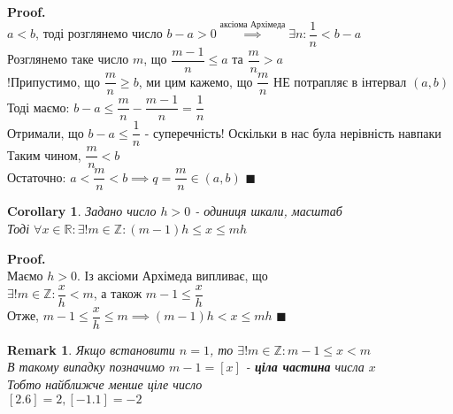 \documentclass[a4paper, 14pt]{extarticle}
\theoremstyle{theoremdd}
\theoremstyle{theoremdd}
\theoremstyle{theoremdd}
\theoremstyle{theoremdd}
\theoremstyle{theoremdd}
\theoremstyle{theoremdd}
\newtheorem{remark}[theorem]{Remark}
\theoremstyle{theoremdd}
\theoremstyle{theoremdd}
\newtheorem{corollary}[theorem]{Corollary}
\newenvironment{pf}{\vspace*{-3mm} \textbf{Proof. \\}}{$\blacksquare$}
\begin{document}
	\begin{pf}
	$a < b$, тоді розглянемо число $b-a>0 \overset{\textrm{аксіома Архімеда}}{\implies} \exists n: \dfrac{1}{n} < b-a$\\
	Розглянемо таке число $m$, що $\dfrac{m-1}{n} \leq a$ та $\dfrac{m}{n} > a$\\
	!Припустимо, що $\dfrac{m}{n} \geq b$, ми цим кажемо, що $\dfrac{m}{n}$ НЕ потрапляє в інтервал $(a,b)$\\
	Тоді маємо: $b - a \leq \dfrac{m}{n} - \dfrac{m-1}{n} = \dfrac{1}{n}$\\
	Отримали, що $b-a \leq \dfrac{1}{n}$ - суперечність! Оскільки в нас була нерівність навпаки\\
	Таким чином, $\dfrac{m}{n} < b$\\
	Остаточно: $a < \dfrac{m}{n} < b \implies q = \dfrac{m}{n} \in (a,b)$
	\end{pf}
	
	\begin{corollary}
	Задано число $h > 0$ - одиниця шкали, масштаб\\
	Тоді $\forall x \in \mathbb{R}: \exists ! m \in \mathbb{Z}: (m-1)h \leq x \leq mh$
	\end{corollary}
	
	\begin{pf}
	Маємо $h>0$. Із аксіоми Архімеда випливає, що\\
	$\exists !m \in \mathbb{Z}: \dfrac{x}{h} < m$, а також $m-1 \leq \dfrac{x}{h}$\\
	Отже, $m-1 \leq \dfrac{x}{h} \leq m \implies (m-1)h < x \leq mh$
	\end{pf}
	
	\begin{remark}
	Якщо встановити $n = 1$, то $\exists !m \in \mathbb{Z}: m-1 \leq x < m$\\
	В такому випадку позначимо $m-1 = [x]$ - \textbf{ціла частина} числа $x$\\
	Тобто найближче менше ціле число\\
	$[2.6] = 2, [-1.1] = -2$
	\end{remark}
	
\end{document}
